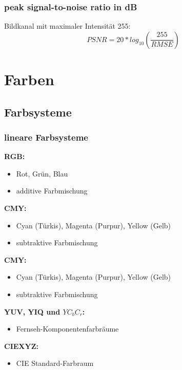 \documentclass[10pt]{article}
\begin{document}
\subsubsection*{peak signal-to-noise ratio in dB}
Bildkanal mit maximaler Intensität 255:
\begin{equation*}
	PSNR = 20 * log_{10} \left( \frac{255}{RMSE} \right)
\end{equation*}

\pagebreak
\section{Farben}

\subsection{Farbsysteme}
\subsubsection{lineare Farbsysteme}
\textbf{RGB:}
\begin{itemize}
	\item Rot, Grün, Blau
	\item additive Farbmischung
\end{itemize}
\textbf{CMY:}
\begin{itemize}
	\item Cyan (Türkis), Magenta (Purpur), Yellow (Gelb)
	\item subtraktive Farbmischung
\end{itemize}
\textbf{CMY:}
\begin{itemize}
	\item Cyan (Türkis), Magenta (Purpur), Yellow (Gelb)
	\item subtraktive Farbmischung
\end{itemize}
\textbf{YUV, YIQ und $YC_bC_r$:}
\begin{itemize}
	\item Fernseh-Komponentenfarbräume
\end{itemize}
\textbf{CIEXYZ:}
\begin{itemize}
	\item CIE Standard-Farbraum
\end{itemize}
\end{document}
